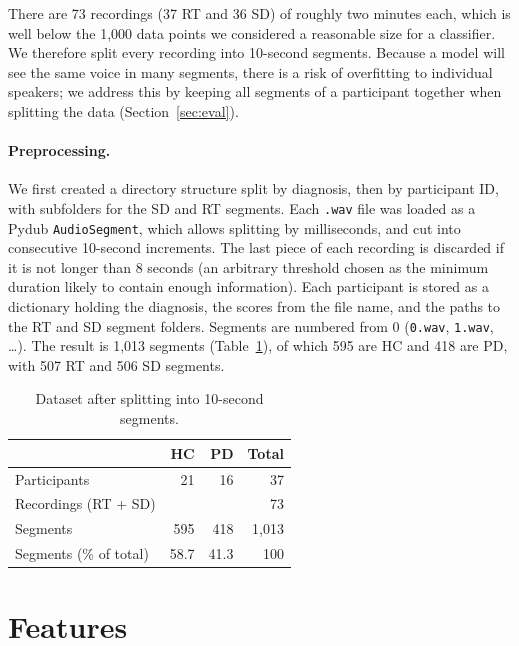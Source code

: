 \documentclass[11pt]{article}
\begin{document}
There are 73 recordings (37 RT and 36 SD) of roughly two minutes each, which is well
below the 1,000 data points we considered a reasonable size for a classifier. We therefore
split every recording into 10-second segments. Because a model will see the same voice in
many segments, there is a risk of overfitting to individual speakers; we address this by
keeping all segments of a participant together when splitting the data
(Section~\ref{sec:eval}).

\paragraph{Preprocessing.}
We first created a directory structure split by diagnosis, then by participant ID, with
subfolders for the SD and RT segments. Each \texttt{.wav} file was loaded as a Pydub
\texttt{AudioSegment}, which allows splitting by milliseconds, and cut into consecutive
10-second increments. The last piece of each recording is discarded if it is not longer
than 8 seconds (an arbitrary threshold chosen as the minimum duration likely to contain
enough information). Each participant is stored as a dictionary holding the diagnosis, the
scores from the file name, and the paths to the RT and SD segment folders. Segments are
numbered from 0 (\texttt{0.wav}, \texttt{1.wav}, \dots). The result is 1,013 segments
(Table~\ref{tab:data}), of which 595 are HC and 418 are PD, with 507 RT and 506 SD segments.

\begin{table}[t]
  \centering
  \small
  \begin{tabular}{lrrr}
    \hline
    & \textbf{HC} & \textbf{PD} & \textbf{Total} \\
    \hline
    Participants & 21 & 16 & 37 \\
    Recordings (RT + SD) & & & 73 \\
    Segments & 595 & 418 & 1,013 \\
    Segments (\% of total) & 58.7 & 41.3 & 100 \\
    \hline
  \end{tabular}
  \caption{Dataset after splitting into 10-second segments.}
  \label{tab:data}
\end{table}

\section{Features}
\end{document}
